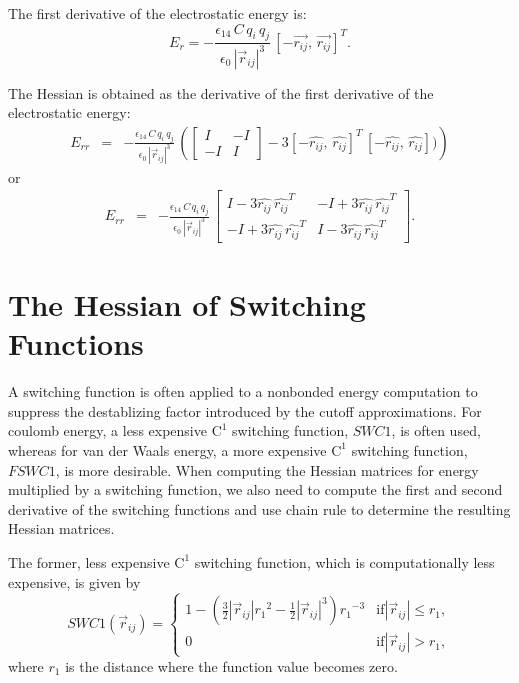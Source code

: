 \documentclass[11pt]{article}
\newcommand{\hatr}[1]{\mbox{$\hat{{r}_{#1}}$}}
\newcommand{\AbsVr}[1]{\mbox{$\left| \vec{r}_{#1} \right| $}}
\begin{document}
The first derivative of the electrostatic energy is:
\begin{equation}
E_r = -\frac{\epsilon_{14} \, C\, q_i\, q_j}
{\epsilon_0\,\AbsVr{ij}^3}\,[-\vec{r_{ij}}, \,\vec{r_{ij}}]^T.
\end{equation}

The Hessian is obtained as the derivative of the first derivative of
the electrostatic energy:
\begin{eqnarray}
E_{rr}&=& -\frac{\epsilon_{14} \, C\, q_i\, q_j}
{\epsilon_0\,\AbsVr{ij}^3}\,
\left(\left[\begin{array}{cc}
I & -I \\
-I & I
\end{array}\right] - 3 [-\hatr{ij}, \,\hatr{ij}]^T
\,[-\hatr{ij}, \,\hatr{ij}])\right)
\end{eqnarray}
or 
\begin{eqnarray}
E_{rr}&=& -\frac{\epsilon_{14} \, C\, q_i\, q_j}
{\epsilon_0\,\AbsVr{ij}^3}\,
\left[\begin{array}{cc}
I - 3 \hatr{ij} \,\hatr{ij}^T & -I+3\hatr{ij} \,\hatr{ij}^T \\
-I+3\hatr{ij} \,\hatr{ij}^T & I-3\hatr{ij} \,\hatr{ij}^T
\end{array}\right].
\end{eqnarray}


\section{The Hessian of Switching Functions}
A switching function is often applied to a nonbonded energy
computation to suppress the destablizing factor introduced by the
cutoff approximations. For coulomb energy, a less expensive $\mathrm{C}^{1}$
switching function, $SWC1$, is often used, whereas for van der Waals energy, a
more expensive $\mathrm{C}^{1}$ switching function, $FSWC1$, is more
desirable. When computing the Hessian matrices for energy multiplied
by a switching function, we also need to compute the first and second
derivative of the switching functions and use chain rule to determine
the resulting Hessian matrices.

The former, less expensive $\mathrm{C}^{1}$ switching function, which is
computationally less expensive, is given by
\begin{equation}
SWC1(\vec{r}_{ij})=\begin{cases}
1-(\frac{3}{2}|\vec{r}_{ij}|{r_1}^{2}-\frac{1}{2}|\vec{r}_{ij}|^{3})
{r_1}^{-3} & \mbox{if}  |\vec{r}_{ij}|\leq {r_1}{,}\\
0 & \mbox{if}  |\vec{r}_{ij}|>{r_1}{,}
\end{cases}
\end{equation}
where ${r_1}$ is the distance where the function value becomes zero.
\end{document}
